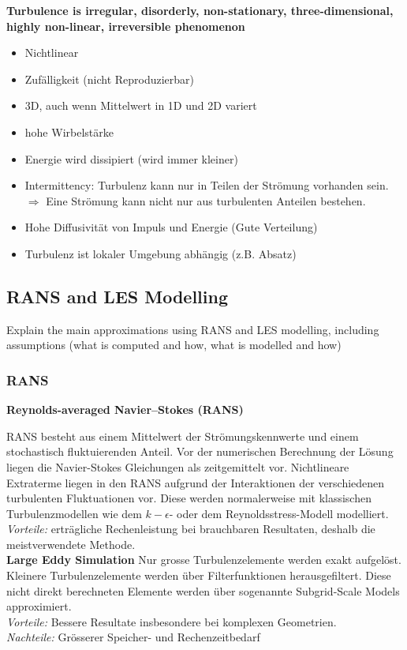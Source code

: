 \documentclass[a4paper]{scrartcl}
\begin{document}
\textbf{Turbulence is irregular, disorderly, non-stationary, three-dimensional,
highly non-linear, irreversible phenomenon}

\begin{itemize} 
\item Nichtlinear
\item Zufälligkeit (nicht Reproduzierbar)
\item 3D, auch wenn Mittelwert in 1D und 2D variert
\item hohe Wirbelstärke
\item Energie wird dissipiert (wird immer kleiner)
\item Intermittency: Turbulenz kann nur in Teilen der Strömung vorhanden sein.
$\Rightarrow$ Eine Strömung kann nicht nur aus turbulenten Anteilen bestehen.
\item Hohe Diffusivität von Impuls und Energie (Gute Verteilung)
\item Turbulenz ist lokaler Umgebung abhängig (z.B. Absatz)
\end{itemize}
\subsection{RANS and LES Modelling}
Explain the main approximations using RANS
and LES modelling, including assumptions (what is computed and how, what is modelled and how)
\subsubsection{RANS}
\textbf{Reynolds-averaged Navier–Stokes (RANS)}

RANS besteht aus einem Mittelwert der Strömungskennwerte und einem stochastisch
fluktuierenden Anteil. Vor der numerischen Berechnung der Lösung liegen die
Navier-Stokes Gleichungen als zeitgemittelt vor. Nichtlineare Extraterme liegen
in den RANS aufgrund der Interaktionen der verschiedenen turbulenten Fluktuationen vor.
Diese werden normalerweise mit klassischen Turbulenzmodellen wie dem
$k-\epsilon$- oder dem Reynoldsstress-Modell modelliert.
\\
\textit{Vorteile:} erträgliche Rechenleistung bei brauchbaren Resultaten,
deshalb die meistverwendete Methode. \\
\vspace{0.5cm}
\textbf{Large Eddy Simulation}
Nur grosse Turbulenzelemente werden exakt aufgelöst. Kleinere Turbulenzelemente
werden über Filterfunktionen herausgefiltert. Diese nicht direkt berechneten
Elemente werden über sogenannte Subgrid-Scale Models approximiert. \\
\vspace{0.5cm}
\textit{Vorteile:} Bessere Resultate insbesondere bei komplexen Geometrien. \\
\textit{Nachteile:} Grösserer Speicher- und Rechenzeitbedarf
\end{document}
